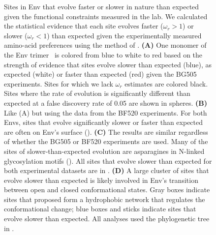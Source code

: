 \documentclass[9pt]{elife}
\begin{document}
\begin{figure}
\caption{\label{fig:divsel}
Sites in Env that evolve faster or slower in nature than expected given the functional constraints measured in the lab.
We calculated the statistical evidence that each site evolves faster ($\omega_r > 1$) or slower ($\omega_r < 1$) than expected given the experimentally measured amino-acid preferences using the method of \citet{bloom2017identification}.
{\bf (A)}
One monomer of the Env trimer~\citep[PDB 5FYL;][]{stewart2016trimeric} is colored from blue to white to red based on the strength of evidence that sites evolve slower than expected (blue), as expected (white) or faster than expected (red) given the BG505 experiments.
Sites for which we lack $\omega_r$ estimates are colored black.
Sites where the rate of evolution is significantly different than expected at a false discovery rate of 0.05 are shown in spheres.
{\bf (B)}
Like (A) but using the data from the BF520 experiments.
For both Envs, sites that evolve significantly slower or faster than expected are often on Env's surface ().
{\bf (C)}
The results are similar regardless of whether the BG505 or BF520 experiments are used.
Many of the sites of slower-than-expected evolution are asparagines in N-linked glycosylation motifs ().
All sites that evolve slower than expected for both experimental datasets are in .
{\bf (D)} 
A large cluster of sites that evolve slower than expected is likely involved in Env's transition between open and closed conformational states.
Gray boxes indicate sites that \citet[PDB 5VN3]{ozorowski2017open} proposed form a hydrophobic network that regulates the conformational change; blue boxes and sticks indicate sites that evolve slower than expected.
All analyses used the phylogenetic tree in .
}
\end{figure}
\end{document}
